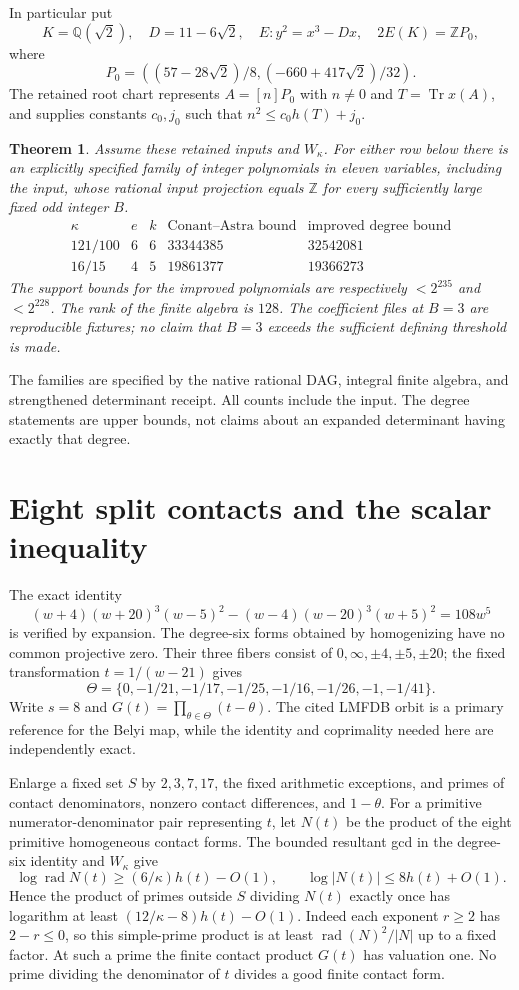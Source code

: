 \documentclass[11pt,a4paper]{article}
\newcommand{\Q}{\mathbb Q}\newcommand{\Z}{\mathbb Z}
\newcommand{\Tr}{\operatorname{Tr}}\newcommand{\rad}{\operatorname{rad}}
\newtheorem{theorem}{Theorem}\newtheorem{lemma}[theorem]{Lemma}
\begin{document}
In particular put
\[
 K=\Q(\sqrt2),\quad D=11-6\sqrt2,\quad E:y^2=x^3-Dx,
 \quad 2E(K)=\Z P_0,
\]
where
\[
 P_0=\left((57-28\sqrt2)/8,(-660+417\sqrt2)/32\right).
\]
The retained root chart represents $A=[n]P_0$ with $n\ne0$ and
\(T=\Tr x(A)\), and supplies constants $c_0,j_0$ such that
\(n^2\le c_0 h(T)+j_0\).

\begin{theorem}\label{thm:main}
Assume these retained inputs and $W_\kappa$.
For either row below there is an explicitly specified family of integer
polynomials in eleven variables, including the input, whose rational input
projection equals $\Z$ for every sufficiently large fixed odd integer $B$.
\[
\begin{array}{c|c|c|r|r}
\kappa&e&k&\text{Conant--Astra bound}&\text{improved degree bound}\\\hline
121/100&6&6&33344385&32542081\\
16/15&4&5&19861377&19366273
\end{array}
\]
The support bounds for the improved polynomials are respectively
$<2^{235}$ and $<2^{228}$. The rank of the finite algebra is $128$.
The coefficient files at $B=3$ are reproducible fixtures; no claim that
$B=3$ exceeds the sufficient defining threshold is made.
\end{theorem}
The families are specified by the native rational DAG, integral finite
algebra, and strengthened determinant receipt. All counts include the
input. The degree statements are upper bounds, not claims about an
expanded determinant having exactly that degree.

\section{Eight split contacts and the scalar inequality}
The exact identity
\[
 (w+4)(w+20)^3(w-5)^2-(w-4)(w-20)^3(w+5)^2=108w^5
\]
is verified by expansion. The degree-six forms obtained by homogenizing
have no common projective zero. Their three fibers consist of
$0,\infty,\pm4,\pm5,\pm20$; the fixed transformation $t=1/(w-21)$ gives
\[
 \Theta=\{0,-1/21,-1/17,-1/25,-1/16,-1/26,-1,-1/41\}.
\]
Write $s=8$ and $G(t)=\prod_{\theta\in\Theta}(t-\theta)$.
The cited LMFDB orbit is a primary reference for the Belyi map, while the
identity and coprimality needed here are independently exact.

Enlarge a fixed set $S$ by $2,3,7,17$, the fixed arithmetic exceptions,
and primes of contact denominators, nonzero contact differences, and
$1-\theta$. For a primitive numerator-denominator pair representing $t$,
let $N(t)$ be the product of the eight primitive homogeneous contact forms.
The bounded resultant gcd in the degree-six identity and $W_\kappa$ give
\[
 \log\rad N(t)\ge(6/\kappa)h(t)-O(1),\qquad
 \log|N(t)|\le8h(t)+O(1).
\]
Hence the product of primes outside $S$ dividing $N(t)$ exactly once
has logarithm at least $(12/\kappa-8)h(t)-O(1)$. Indeed each exponent
$r\ge2$ has $2-r\le0$, so this simple-prime product is at least
$\rad(N)^2/|N|$ up to a fixed factor. At such a prime the finite contact
product $G(t)$ has valuation one. No prime dividing the denominator of
$t$ divides a good finite contact form.
\end{document}
